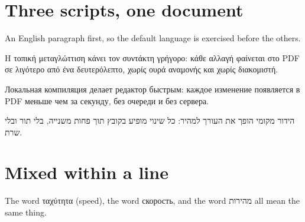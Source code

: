 \documentclass[11pt]{article}
\begin{document}
\section{Three scripts, one document}

An English paragraph first, so the default language is exercised before the others.

\begin{greek}
Η τοπική μεταγλώττιση κάνει τον συντάκτη γρήγορο: κάθε αλλαγή φαίνεται στο PDF σε λιγότερο
από ένα δευτερόλεπτο, χωρίς ουρά αναμονής και χωρίς διακομιστή.
\end{greek}

\begin{russian}
Локальная компиляция делает редактор быстрым: каждое изменение появляется в PDF меньше чем
за секунду, без очереди и без сервера.
\end{russian}

\begin{hebrew}
הידור מקומי הופך את העורך למהיר: כל שינוי מופיע בקובץ תוך פחות משנייה, בלי תור ובלי שרת.
\end{hebrew}

\section{Mixed within a line}
The word \textgreek{ταχύτητα} (speed), the word \textrussian{скорость}, and the word
\texthebrew{מהירות} all mean the same thing.
\end{document}
